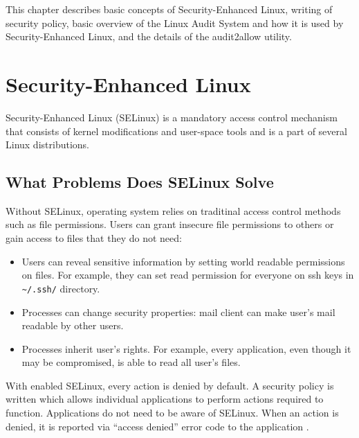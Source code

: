 This chapter describes basic concepts of Security-Enhanced Linux, writing of
security policy, basic overview of the Linux Audit System and how it is used by
Security-Enhanced Linux, and the details of the audit2allow utility.

\section{Security-Enhanced Linux}

Security-Enhanced Linux (SELinux) is a mandatory access control mechanism that
consists of kernel modifications and user-space tools and is a part of several
Linux distributions.

\subsection{What Problems Does SELinux Solve}
Without SELinux, operating system relies on traditinal access control methods
such as file permissions. Users can grant insecure file permissions to others or
gain access to files that they do not need:
\begin{itemize}
    \item Users can reveal sensitive information by setting world readable
        permissions on files. For example, they can set read permission for
        everyone on ssh keys in \texttt{\textasciitilde/.ssh/} directory.
    \item Processes can change security properties: mail client can make user's
        mail readable by other users.
    \item Processes inherit user's rights. For example, every application, even
        though it may be compromised, is able to read all user's files.
\end{itemize}

With enabled SELinux, every action is denied by default. A security policy is
written which allows individual applications to perform actions required to
function. Applications do not need to be aware of SELinux. When an action is
denied, it is reported via ``access denied'' error code to the application
\cite{centoshowto}.

